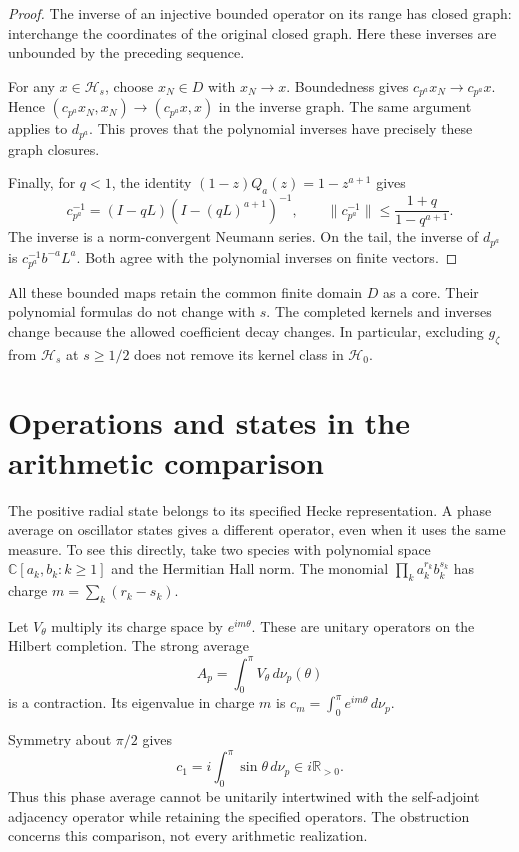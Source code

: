 \begin{proof}
The inverse of an injective bounded operator on its range has closed
graph: interchange the coordinates of the original closed graph.
Here these inverses are unbounded by the preceding sequence.

For any $x\in\mathcal H_s$, choose $x_N\in D$ with $x_N\to x$.
Boundedness gives $c_{p^a}x_N\to c_{p^a}x$.
Hence $(c_{p^a}x_N,x_N)\to(c_{p^a}x,x)$ in the inverse graph.
The same argument applies to $d_{p^a}$.
This proves that the polynomial inverses have precisely these graph closures.

Finally, for $q<1$, the identity $(1-z)Q_a(z)=1-z^{a+1}$ gives
\[
 c_{p^a}^{-1}=(I-qL)(I-(qL)^{a+1})^{-1},\qquad
 \|c_{p^a}^{-1}\|\leq\frac{1+q}{1-q^{a+1}}.
\]
The inverse is a norm-convergent Neumann series.
On the tail, the inverse of $d_{p^a}$ is
$c_{p^a}^{-1}b^{-a}L^a$.
Both agree with the polynomial inverses on finite vectors.
\end{proof}

All these bounded maps retain the common finite domain $D$ as a core.
Their polynomial formulas do not change with $s$.
The completed kernels and inverses change because the allowed
coefficient decay changes.
In particular, excluding $g_\zeta$ from $\mathcal H_s$ at $s\geq1/2$
does not remove its kernel class in $\mathcal H_0$.

\section{Operations and states in the arithmetic comparison}
\label{v4-arith:hecke:sec:arithmetic}

The positive radial state belongs to its specified Hecke representation.
A phase average on oscillator states gives a different operator,
even when it uses the same measure.
To see this directly, take two species with polynomial space
$\mathbb C[a_k,b_k:k\geq1]$ and the Hermitian Hall norm.
The monomial $\prod_ka_k^{r_k}b_k^{s_k}$ has charge
$m=\sum_k(r_k-s_k)$.

Let $V_\theta$ multiply its charge space by $e^{im\theta}$.
These are unitary operators on the Hilbert completion.
The strong average
\[
 A_p=\int_0^\pi V_\theta\,d\nu_p(\theta)
\]
is a contraction. Its eigenvalue in charge $m$ is
$c_m=\int_0^\pi e^{im\theta}\,d\nu_p$.

Symmetry about $\pi/2$ gives
\[
 c_1=i\int_0^\pi\sin\theta\,d\nu_p\in i\mathbb R_{>0}.
\]
Thus this phase average cannot be unitarily intertwined with the
self-adjoint adjacency operator while retaining the specified operators.
The obstruction concerns this comparison, not every arithmetic realization.

